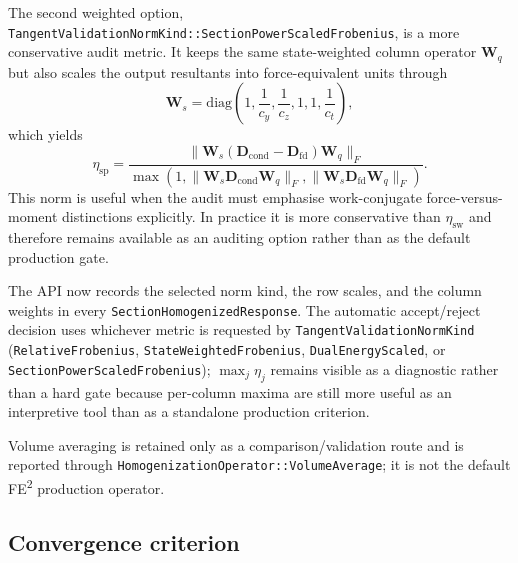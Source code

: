 The second weighted option,
\texttt{TangentValidationNormKind::SectionPowerScaledFrobenius}, is a more
conservative audit metric.  It keeps the same state-weighted column operator
\(\mathbf{W}_q\) but also scales the output resultants into
force-equivalent units through
\begin{equation}
  \mathbf{W}_s
  =
  \mathrm{diag}\!\left(
    1,\frac{1}{c_y},\frac{1}{c_z},1,1,\frac{1}{c_t}
  \right),
  \label{eq:ms-pub-section-power-row-scaling}
\end{equation}
which yields
\begin{equation}
  \eta_{\mathrm{sp}}
  =
  \frac{\lVert
      \mathbf{W}_s(\mathbf{D}_{\mathrm{cond}}-\mathbf{D}_{\mathrm{fd}})
      \mathbf{W}_q
    \rVert_F}
       {\max\!\left(
          1,
          \lVert \mathbf{W}_s \mathbf{D}_{\mathrm{cond}}\mathbf{W}_q \rVert_F,
          \lVert \mathbf{W}_s \mathbf{D}_{\mathrm{fd}}\mathbf{W}_q \rVert_F
       \right)}.
  \label{eq:ms-pub-section-power-gap}
\end{equation}
This norm is useful when the audit must emphasise work-conjugate
force-versus-moment distinctions explicitly.  In practice it is more
conservative than \(\eta_{\mathrm{sw}}\) and therefore remains available as an
auditing option rather than as the default production gate.

The API now records the selected norm kind, the row scales, and the column
weights in every \texttt{SectionHomogenizedResponse}.  The automatic
accept/reject decision uses whichever metric is requested by
\texttt{TangentValidationNormKind}
(\texttt{RelativeFrobenius}, \texttt{StateWeightedFrobenius},
\texttt{DualEnergyScaled}, or \texttt{SectionPowerScaledFrobenius});
\(\max_j \eta_j\) remains visible as a diagnostic rather than a hard gate
because per-column maxima are still more useful as an interpretive tool than
as a standalone production criterion.

Volume averaging is retained only as a comparison/validation route and is
reported through \texttt{HomogenizationOperator::VolumeAverage}; it is not the
default FE\textsuperscript{2} production operator.

\subsection{Convergence criterion}

